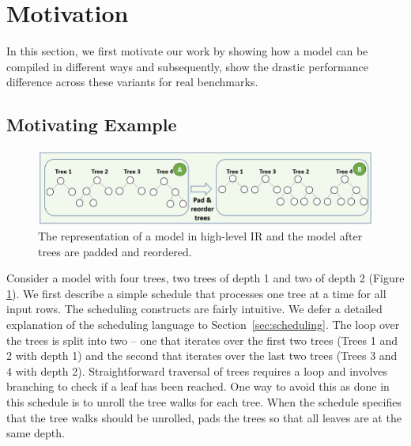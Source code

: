 \section{Motivation}
\label{sec:motivation}
In this section, we first motivate our work by showing how a model can be compiled in different ways
and subsequently, show the drastic performance difference across these variants for real benchmarks.

\subsection{Motivating Example}
\begin{figure}[htb]
  \centering
  \includegraphics[width=\linewidth]{figures/HIR.PNG}
  \caption{The representation of a model in high-level IR and the model 
  after trees are padded and reordered. }
  \label{Fig:HIRExample}
\end{figure}

Consider a model with four trees, two 
trees of depth 1 and two of depth 2 (Figure \ref{Fig:HIRExample}).
We first describe a simple schedule that processes one tree at a time 
for all input rows. The scheduling constructs are fairly intuitive. We 
defer a detailed explanation of the scheduling language to Section~\ref{sec:scheduling}. 
The loop over the trees is split into two -- one that
iterates over the first two trees (Trees 1 and 2 with depth 1) and 
the second that iterates over the last two trees (Trees 3 and 4 with
depth 2). Straightforward traversal of trees requires a  loop
and involves branching to check if a leaf has been reached. 
One way to avoid this as done in this schedule is to unroll the 
tree walks for each tree. 
When the schedule specifies that the tree walks should be unrolled, 
\Treebeard{} pads the trees so that all leaves are at the same depth.

